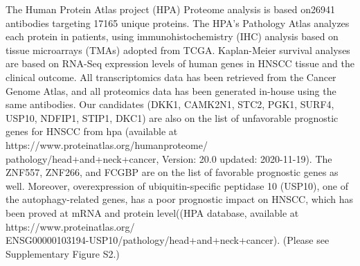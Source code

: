 \documentclass[preprint,12pt]{elsarticle}
\newenvironment{MyColorPar}[1]{%
    \leavevmode\color{#1}\ignorespaces%
}{%
}%
\begin{document}
\begin{MyColorPar}{blue}
 
The Human Protein Atlas project (HPA) Proteome analysis is based on26941 antibodies targeting 17165 unique proteins. The HPA's Pathology Atlas analyzes each protein in patients, using immunohistochemistry (IHC) analysis based on tissue microarrays (TMAs) adopted from TCGA. Kaplan-Meier survival analyses are based on RNA-Seq expression levels of human genes in HNSCC tissue and the clinical outcome.
All transcriptomics data has been retrieved from the Cancer Genome Atlas, and all proteomics data has been generated in-house using the same antibodies.
Our candidates (DKK1, CAMK2N1, STC2, PGK1, SURF4, USP10, NDFIP1, STIP1, DKC1) are also on the list of unfavorable prognostic genes for HNSCC from \acrfull{hpa} (available at https://www.proteinatlas.org/humanproteome/\\pathology/head+and+neck+cancer, Version: 20.0 updated: 2020-11-19). The ZNF557, ZNF266, and FCGBP are on the list of favorable prognostic genes as well.
Moreover, overexpression of ubiquitin-specific peptidase 10 (USP10), one of the autophagy-related genes, has a poor prognostic impact on HNSCC, which has been proved at mRNA and protein level((HPA database, available at https://www.proteinatlas.org/\\ENSG00000103194-USP10/pathology/head+and+neck+cancer)\cite{Ren2020}.
(Please see Supplementary Figure S2.) %





\end{MyColorPar}
\end{document}
